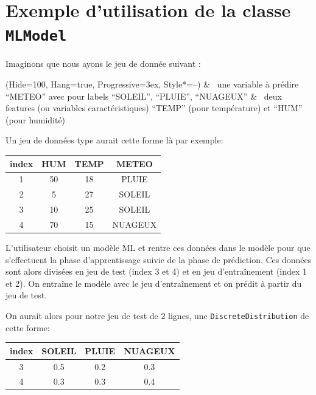 \section{Exemple d'utilisation de la classe \texttt{MLModel}}

Imaginons que nous ayons le jeu de donnée suivant : 
\begin{easylist}
\ListProperties(Hide=100, Hang=true, Progressive=3ex, Style*=--)
& ~une variable à prédire “METEO” avec pour labels “SOLEIL”, “PLUIE”, “NUAGEUX”
& ~deux features (ou variables caractéristiques) “TEMP” (pour température) et “HUM” (pour humidité)
\end{easylist}

Un jeu de données type aurait cette forme là par exemple:

\begin{center}
\begin{tabular}{cccc}
\rowcolor[RGB]{200, 200, 200}index & HUM & TEMP & METEO \\
\hline
1 & 50 & 18 & PLUIE \\
2 & 5 & 27 & SOLEIL \\
3 & 10 & 25 & SOLEIL \\
4 & 70 & 15 & NUAGEUX

\end{tabular}
\label{tab1}
\end{center}

L’utilisateur choisit un modèle ML et rentre ces données dans le modèle pour que s’effectuent la phase d’apprentissage suivie de la phase de prédiction.
Ces données sont alors divisées en jeu de test (index 3 et 4) et en jeu d’entraînement (index 1 et 2). On entraîne le modèle avec le jeu d’entraînement et on prédit à partir du jeu de test.

On aurait alors pour notre jeu de test de 2 lignes, une \texttt{DiscreteDistribution} de cette forme:

\begin{center}
\begin{tabular}{cccc}
\rowcolor[RGB]{200, 200, 200}index & SOLEIL & PLUIE & NUAGEUX \\
\hline
3 & 0.5 & 0.2 & 0.3 \\
4 & 0.3 & 0.3 & 0.4

\end{tabular}
\label{tab2}
\end{center}

